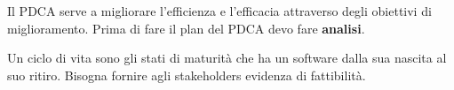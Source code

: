 Il PDCA serve a migliorare l'efficienza e l'efficacia attraverso degli obiettivi di miglioramento. Prima di fare il plan del PDCA devo fare \textbf{analisi}. 

Un ciclo di vita sono gli stati di maturità che ha un software dalla sua nascita al suo ritiro. Bisogna fornire agli stakeholders evidenza di fattibilità.

